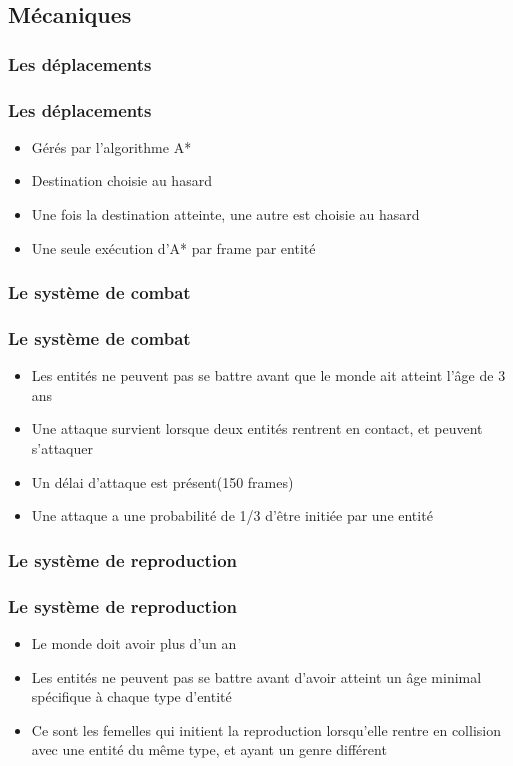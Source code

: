 \documentclass{beamer}
\begin{document}
\subsection{Mécaniques}
\subsubsection{Les déplacements}

\begin{frame} \frametitle{Les déplacements}
	\begin{itemize}
		\item Gérés par l'algorithme A*
		\item Destination choisie au hasard
		\item Une fois la destination atteinte, une autre est choisie au hasard
		\item Une seule exécution d'A* par frame par entité
	\end{itemize}
\end{frame}

\subsubsection{Le système de combat}

\begin{frame} \frametitle{Le système de combat}
	\begin{itemize}
		\item Les entités ne peuvent pas se battre avant que le monde ait atteint l'âge de 3 ans
		\item Une attaque survient lorsque deux entités rentrent en contact, et peuvent s'attaquer
		\item Un délai d'attaque est présent(150 frames)
		\item Une attaque a une probabilité de 1/3 d'être initiée par une entité
	\end{itemize}
\end{frame}

\subsubsection{Le système de reproduction}

\begin{frame} \frametitle{Le système de reproduction}
	\begin{itemize}
		\item Le monde doit avoir plus d'un an
		\item Les entités ne peuvent pas se battre avant d'avoir atteint un âge minimal spécifique à chaque type d'entité
		\item Ce sont les femelles qui initient la reproduction lorsqu'elle rentre en collision avec une entité du même type, et ayant un genre différent
	\end{itemize}
\end{frame}
\end{document}

